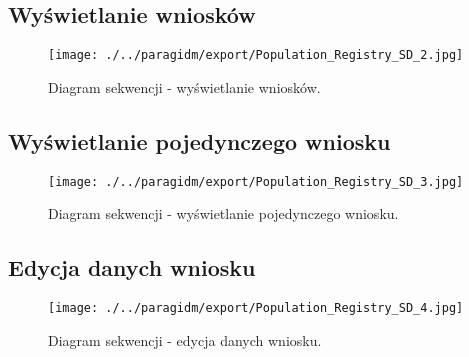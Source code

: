 \documentclass[12pt]{article}
\begin{document}

\subsection{Wyświetlanie wniosków}
\begin{figure}[H]
    \centering
    \texttt{[image: ./../paragidm/export/Population\_Registry\_SD\_2.jpg]}
    \caption{Diagram sekwencji - wyświetlanie wniosków.}
    \label{}
\end{figure}



\subsection{Wyświetlanie pojedynczego wniosku}
\begin{figure}[H]
    \centering
    \texttt{[image: ./../paragidm/export/Population\_Registry\_SD\_3.jpg]}
    \caption{Diagram sekwencji - wyświetlanie pojedynczego wniosku.}
    \label{}
\end{figure}



\subsection{Edycja danych wniosku}
\begin{figure}[H]
    \centering
    \texttt{[image: ./../paragidm/export/Population\_Registry\_SD\_4.jpg]}
    \caption{Diagram sekwencji - edycja danych wniosku.}
    \label{}
\end{figure}


\end{document}
